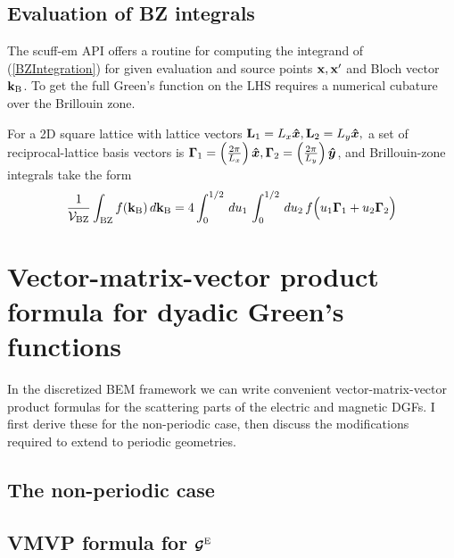 \documentclass[letterpaper]{article}
\begin{document}
\subsection*{Evaluation of BZ integrals}

The {\sc scuff-em} API offers a routine for computing the integrand of
(\ref{BZIntegration}) for given evaluation and source points
$\mathbf{x}, \mathbf{x}^\prime$ and Bloch vector $\mathbf{k}_{\text{\scriptsize B}}$. To get the 
full Green's function on the LHS requires a numerical cubature
over the Brillouin zone.

For a 2D square lattice with lattice vectors 
$\mathbf{L}_1=L_x\boldsymbol{\hat{x}}, \mathbf{L}_2=L_y\boldsymbol{\hat{x}},$
a set of reciprocal-lattice basis vectors is 
$\boldsymbol{\Gamma}_1=\left(\frac{2\pi}{L_x}\right) \boldsymbol{\hat{x}},
 \boldsymbol{\Gamma}_2=\left(\frac{2\pi}{L_y}\right) \boldsymbol{\hat{y}}$,
and Brillouin-zone integrals take the form
$$ \frac{1}{\mathcal{V}_{\text{\scriptsize BZ}}} 
   \int_{\text{\scriptsize BZ}} f(\mathbf{k}_{\text{\scriptsize B}}) \, d \mathbf{k}_{\text{\scriptsize B}}
  =4\int_0^{1/2} \, d u_1 \, \int_0^{1/2} \, d u_2 \, 
   f\Big( u_1\boldsymbol{\Gamma}_1 + u_2\boldsymbol{\Gamma}_2 \Big)
$$

\newpage
\section{Vector-matrix-vector product formula for dyadic Green's functions}

In the discretized BEM framework we can write convenient
vector-matrix-vector product formulas for the scattering parts
of the electric and magnetic DGFs. I first derive these for
the non-periodic case, then discuss the modifications required
to extend to periodic geometries.

\subsection{The non-periodic case}

\subsection*{VMVP formula for $\boldsymbol{\mathcal{G}}^{\text{\scriptsize E}}$}
\end{document}
